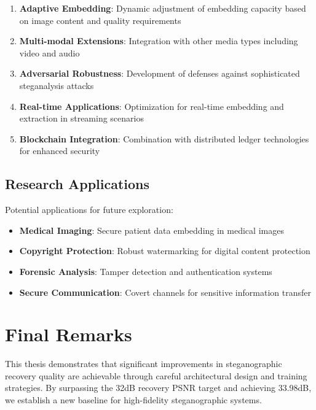 \documentclass[12pt,a4paper]{report}
\begin{document}
\begin{enumerate}
    \item \textbf{Adaptive Embedding}: Dynamic adjustment of embedding capacity based on image content and quality requirements
    
    \item \textbf{Multi-modal Extensions}: Integration with other media types including video and audio
    
    \item \textbf{Adversarial Robustness}: Development of defenses against sophisticated steganalysis attacks
    
    \item \textbf{Real-time Applications}: Optimization for real-time embedding and extraction in streaming scenarios
    
    \item \textbf{Blockchain Integration}: Combination with distributed ledger technologies for enhanced security
\end{enumerate}

\subsection{Research Applications}

Potential applications for future exploration:

\begin{itemize}
    \item \textbf{Medical Imaging}: Secure patient data embedding in medical images
    \item \textbf{Copyright Protection}: Robust watermarking for digital content protection
    \item \textbf{Forensic Analysis}: Tamper detection and authentication systems
    \item \textbf{Secure Communication}: Covert channels for sensitive information transfer
\end{itemize}

\section{Final Remarks}

This thesis demonstrates that significant improvements in steganographic recovery quality are achievable through careful architectural design and training strategies. By surpassing the 32dB recovery PSNR target and achieving 33.98dB, we establish a new baseline for high-fidelity steganographic systems.
\end{document}
